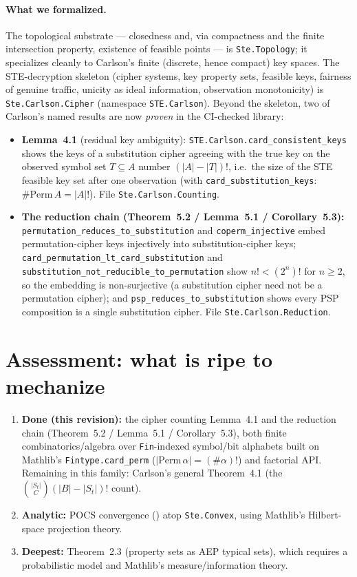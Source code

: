 \documentclass[11pt]{article}
\begin{document}
\paragraph{What we formalized.} The topological substrate ---
closedness and, via compactness and the finite intersection property,
existence of feasible points --- is \texttt{Ste.Topology}; it specializes
cleanly to Carlson's finite (discrete, hence compact) key spaces. The
STE-decryption skeleton (cipher systems, key property sets, feasible
keys, fairness of genuine traffic, unicity as ideal information,
observation monotonicity) is \texttt{Ste.Carlson.Cipher} (namespace
\texttt{STE.Carlson}). Beyond the skeleton, two of Carlson's named
results are now \emph{proven} in the CI-checked library:
\begin{itemize}
\item \textbf{Lemma~4.1} (residual key ambiguity):
  \texttt{STE.Carlson.card\_consistent\_keys} shows the keys of a
  substitution cipher agreeing with the true key on the observed symbol
  set $T\subseteq A$ number $(|A|-|T|)!$, i.e.\ the size of the STE
  feasible key set after one observation (with
  \texttt{card\_substitution\_keys}: $\#\mathrm{Perm}\,A=|A|!$). File
  \texttt{Ste.Carlson.Counting}.
\item \textbf{The reduction chain (Theorem~5.2 / Lemma~5.1 /
  Corollary~5.3):} \texttt{permutation\_reduces\_to\_substitution} and
  \texttt{coperm\_injective} embed permutation-cipher keys injectively
  into substitution-cipher keys;
  \texttt{card\_permutation\_lt\_card\_substitution} and
  \texttt{substitution\_not\_reducible\_to\_permutation} show
  $n!<(2^n)!$ for $n\ge 2$, so the embedding is non-surjective (a
  substitution cipher need not be a permutation cipher); and
  \texttt{psp\_reduces\_to\_substitution} shows every PSP composition is
  a single substitution cipher. File \texttt{Ste.Carlson.Reduction}.
\end{itemize}

\section{Assessment: what is ripe to mechanize}

\begin{enumerate}
\item \textbf{Done (this revision):} the cipher counting Lemma~4.1 and
  the reduction chain (Theorem~5.2 / Lemma~5.1 / Corollary~5.3), both
  finite combinatorics/algebra over \texttt{Fin}-indexed symbol/bit
  alphabets built on Mathlib's \texttt{Fintype.card\_perm}
  ($|\mathrm{Perm}\,\alpha| = (\#\alpha)!$) and factorial API. Remaining
  in this family: Carlson's general Theorem~4.1 (the
  $\binom{|S_t|}{C}(|B|-|S_t|)!$ count).
\item \textbf{Analytic:} POCS convergence (\citealp{youla1982,
  bauschke1996}) atop \texttt{Ste.Convex}, using Mathlib's Hilbert-space
  projection theory.
\item \textbf{Deepest:} Theorem~2.3 (property sets as AEP typical sets),
  which requires a probabilistic model and Mathlib's measure/information
  theory.
\end{enumerate}
\end{document}
